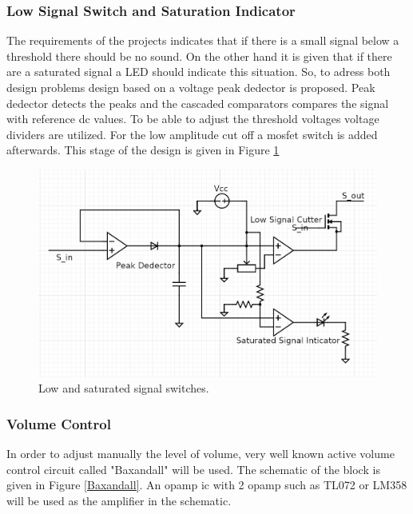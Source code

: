 \documentclass[a4paper,10pt]{IEEEtran}
\begin{document}
\subsubsection{Low Signal Switch and Saturation Indicator}
The requirements of the projects indicates that if there is a small signal below a threshold there should be no sound. On the other hand it is given that if there are a saturated signal a LED should indicate this situation. So, to adress both design problems design based on a voltage peak dedector is proposed. Peak dedector detects the peaks and the cascaded comparators compares the signal with reference dc values. To be able to adjust the threshold voltages voltage dividers are utilized. For the low amplitude cut off a mosfet switch is added afterwards. This stage of the design is given in Figure \ref*{saturated_ind} 
\begin{figure}[H]
    \centering
    \includegraphics[width = 0.75\linewidth]{LowSignalSatSignal.png}
    \caption{Low and saturated signal switches.}
    \label{saturated_ind}    
\end{figure} 

\subsubsection{Volume Control}
In order to adjust manually the level of volume, very well known active volume control circuit called "Baxandall" will be used. The schematic of the block is given in Figure \ref*{Baxandall}. An opamp ic with 2 opamp such as TL072 or LM358 will be used as the amplifier in the schematic. 
\end{document}
